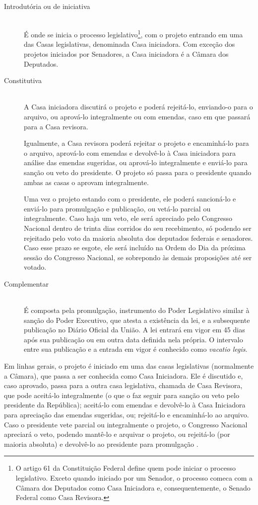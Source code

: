 \documentclass[a4paper,titlepage]{ppgi}\usepackage[]{graphicx}\usepackage[]{color}
\begin{document}
\begin{description}
\item[Introdutória ou de iniciativa] \hfill \\
É onde se inicia o processo legislativo\footnote{O artigo 61 da Constituição
Federal define quem pode iniciar o processo legislativo. Exceto quando iniciado
por um Senador, o processo comeca com a Câmara dos Deputados como Casa
Iniciadora e, consequentemente, o Senado Federal como Casa Revisora.}, com o
projeto entrando em uma das Casas legislativas, denominada Casa iniciadora. Com
exceção dos projetos iniciados por Senadores, a Casa iniciadora é a Câmara dos
Deputados.

\item[Constitutiva] \hfill \\
A Casa iniciadora discutirá o projeto e poderá rejeitá-lo, enviando-o para o
arquivo, ou aprová-lo integralmente ou com emendas, caso em que passará para a
Casa revisora.

Igualmente, a Casa revisora poderá rejeitar o projeto e encaminhá-lo para o
arquivo, aprová-lo com emendas e devolvê-lo à Casa iniciadora para análise das
emendas sugeridas, ou aprová-lo integralmente e enviá-lo para sanção ou veto do
presidente. O projeto só passa para o presidente quando ambas as casas o
aprovam integralmente.

Uma vez o projeto estando com o presidente, ele poderá sancioná-lo e enviá-lo
para promulgação e publicação, ou vetá-lo parcial ou integralmente. Caso haja
um veto, ele será apreciado pelo Congresso Nacional dentro de trinta dias
corridos do seu recebimento, só podendo ser rejeitado pelo voto da maioria
absoluta dos deputados federais e senadores. Caso esse prazo se esgote, ele
será incluído na Ordem do Dia da próxima sessão do Congresso Nacional, se
sobrepondo às demais proposições até ser votado.

\item[Complementar] \hfill \\
É composta pela promulgação, instrumento do Poder Legislativo similar à
sanção do Poder Executivo, que atesta a existência da lei, e a subsequente
publicação no Diário Oficial da União. A lei entrará em vigor em 45 dias após
sua publicação ou em outra data definida nela própria. O intervalo entre sua
publicação e a entrada em vigor é conhecido como \emph{vacatio legis}.
\end{description}

Em linhas gerais, o projeto é iniciado em uma das casas legislativas
(normalmente a Câmara), que passa a ser conhecida como Casa Iniciadora. Ele é
discutido e, caso aprovado, passa para a outra casa legislativa, chamada de
Casa Revisora, que pode aceitá-lo integralmente (o que o faz seguir para sanção
ou veto pelo presidente da República); aceitá-lo com emendas e devolvê-lo à
Casa Iniciadora para apreciação das emendas sugeridas, ou; rejeitá-lo e
encaminhá-lo ao arquivo. Caso o presidente vete parcial ou integralmente o
projeto, o Congresso Nacional apreciará o veto, podendo mantê-lo e arquivar o
projeto, ou rejeitá-lo (por maioria absoluta) e devolvê-lo ao presidente para
promulgação \cite{Carneiro2013}.
\end{document}
